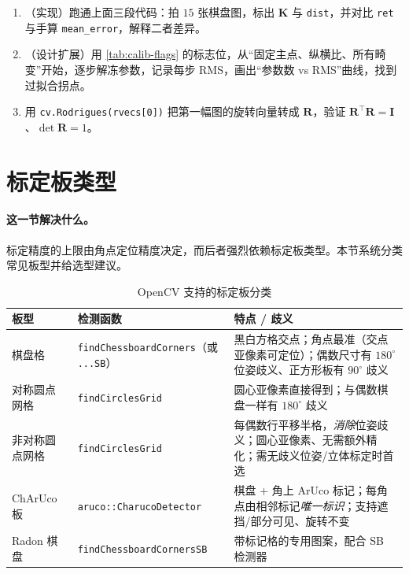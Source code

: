 \begin{practice}[练习]
\begin{enumerate}
  \item （实现）跑通上面三段代码：拍 $15$ 张棋盘图，标出 $\mathbf{K}$ 与 \texttt{dist}，并对比 \texttt{ret} 与手算 \texttt{mean\_error}，解释二者差异。
  \item （设计扩展）用 \cref{tab:calib-flags} 的标志位，从“固定主点、纵横比、所有畸变”开始，逐步解冻参数，记录每步 RMS，画出“参数数 vs RMS”曲线，找到过拟合拐点。
  \item 用 \texttt{cv.\allowbreak Rodrigues(rvecs[0])} 把第一幅图的旋转向量转成 $\mathbf{R}$，验证 $\mathbf{R}^\top\mathbf{R}=\mathbf{I}$、$\det\mathbf{R}=1$。
\end{enumerate}
\end{practice}

\section{标定板类型}
\label{sec:calib-boards}

\paragraph{这一节解决什么。}
标定精度的上限由角点定位精度决定，而后者强烈依赖标定板类型。本节系统分类常见板型并给选型建议。

\begin{table}[ht]\centering\small
\caption{OpenCV 支持的标定板分类\cite{opencv2024pattern,garrido2014aruco}}
\label{tab:calib-boards}
\begin{tabular}{p{} p{} p{}}
\toprule
板型 & 检测函数 & 特点 / 歧义 \\
\midrule
棋盘格 & \texttt{findChessboardCorners}（或 \texttt{...SB}）& 黑白方格交点；角点最准（交点亚像素可定位）；偶数尺寸有 $180^\circ$ 位姿歧义、正方形板有 $90^\circ$ 歧义 \\
对称圆点网格 & \texttt{findCirclesGrid} & 圆心亚像素直接得到；与偶数棋盘一样有 $180^\circ$ 歧义 \\
非对称圆点网格 & \texttt{findCirclesGrid} & 每偶数行平移半格，\emph{消除}位姿歧义；圆心亚像素、无需额外精化；需无歧义位姿/立体标定时首选 \\
ChArUco 板 & \texttt{aruco::CharucoDetector} & 棋盘 $+$ 角上 ArUco 标记；每角点由相邻标记\emph{唯一标识}；支持遮挡/部分可见、旋转不变 \\
Radon 棋盘 & \texttt{findChessboardCornersSB} & 带标记格的专用图案，配合 SB 检测器 \\
\bottomrule
\end{tabular}
\end{table}

